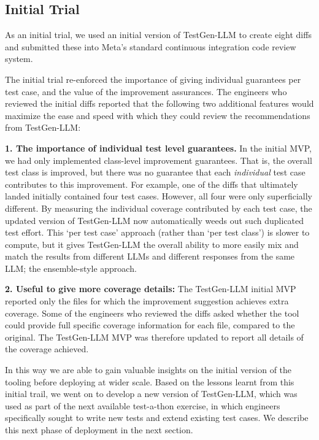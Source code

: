 \documentclass[sigconf,screen]{acmart}
\begin{document}
\subsection{Initial Trial}

As an initial trial, we used an initial version of TestGen-LLM to create eight diffs and submitted these into Meta's standard continuous integration code review system.

The initial trial re-enforced the 
importance of giving individual guarantees per test case, and the value of  the improvement assurances.
The engineers who reviewed the initial diffs reported that the following  two additional features would maximize the ease and speed with which they could review the recommendations from TestGen-LLM:

\noindent
{\bf
1. The importance of individual test level guarantees.}
In the initial MVP, 
we had only implemented class-level improvement guarantees. 
That is, the overall test class is improved, but there was no guarantee that each {\em individual} test case contributes to this improvement.
For example, one of the diffs that ultimately landed initially contained four test cases. 
However, all four were only superficially different. 
By measuring the individual coverage contributed by each test case, the updated version of TestGen-LLM now automatically weeds out such duplicated test effort. 
This `per test case' approach (rather than `per test class')  is slower to compute, but it gives TestGen-LLM the overall ability to more easily mix and match the results from different LLMs and different responses from the same LLM; the ensemble-style approach.

\noindent
{\bf
2. Useful to give more coverage details:}
The TestGen-LLM initial MVP reported only the files for which the improvement suggestion achieves extra coverage. 
Some  of the engineers who reviewed the diffs asked whether the tool could provide full specific coverage information for each file, compared to the original. 
The TestGen-LLM MVP was therefore updated to report all details of the coverage achieved.

In this way we are able to gain valuable insights on the initial version of the tooling before deploying at wider scale. 
Based on the lessons learnt from this initial trail, we went on to develop a new version of TestGen-LLM, which was used as part of the next available test-a-thon exercise, in which engineers specifically sought to write new tests and extend existing test cases. 
We describe this next phase of deployment in the next section.
\end{document}

